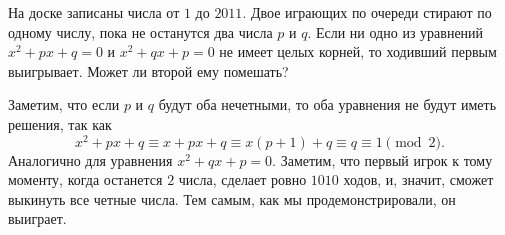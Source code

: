 На доске записаны числа от $1$ до $2011$.
Двое играющих по очереди стирают по одному числу, пока не останутся два числа
$p$ и $q$.
Если ни одно из уравнений $x^2 + p x + q = 0$ и $x^2 + q x + p = 0$ не имеет
целых корней, то ходивший первым выигрывает.
Может ли второй ему помешать?

\solution
Заметим, что если $p$ и $q$ будут оба нечетными, то оба уравнения не будут
иметь решения, так как
\[
   x^2 + p x + q
\equiv
   x + p x + q
\equiv
   x (p + 1) + q
\equiv
   q
\equiv
   1
\pmod{2}
.\]
Аналогично для уравнения $x^2 + q x + p = 0$.
Заметим, что первый игрок к тому моменту, когда останется $2$ числа, сделает
ровно $1010$ ходов, и, значит, сможет выкинуть все четные числа.
Тем самым, как мы продемонстрировали, он выиграет.

